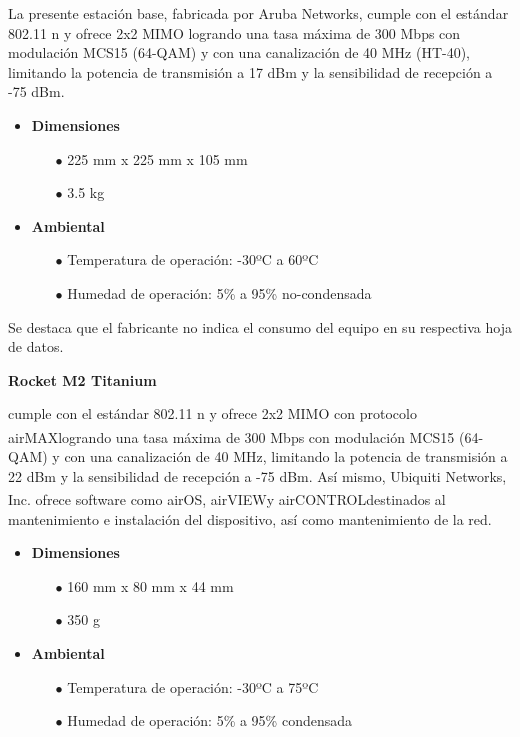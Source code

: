 \documentclass[12pt,a4paper]{book}
\begin{document}
La presente estación base, fabricada por Aruba Networks, cumple con el estándar 802.11 n y ofrece 2x2 MIMO logrando una tasa máxima de 300 Mbps con modulación MCS15 (64-QAM) y con una canalización de 40 
MHz (HT-40), limitando la potencia de transmisión a 17 dBm y la sensibilidad de recepción a -75 dBm. 

\begin{itemize}
\item \textbf{Dimensiones}
	\begin{itemize}
	\item[$\bullet$] 225 mm x 225 mm x 105 mm
	\item[$\bullet$] 3.5 kg
	\end{itemize}
	
\item \textbf{Ambiental}
	\begin{itemize}
	\item[$\bullet$] Temperatura de operación: -30ºC a 60ºC
	\item[$\bullet$] Humedad de operación: 5\% a 95\% no-condensada
	\end{itemize}
\end{itemize}

Se destaca que el fabricante no indica el consumo del equipo en su respectiva hoja de datos.

\medskip 

\begin{large}
\noindent \textbf{Rocket M2 Titanium}
\end{large}

cumple con el estándar 802.11 n y ofrece 2x2 MIMO con protocolo airMAX\textsuperscript \textregistered \thinspace logrando una tasa máxima de 300 Mbps con modulación MCS15 (64-QAM) y con una canalización de 40 MHz, limitando la potencia de transmisión a 22 dBm y la sensibilidad de recepción a -75 dBm. Así mismo, Ubiquiti Networks, Inc. ofrece software como airOS\textsuperscript \textregistered \thinspace , airVIEW\textsuperscript \textregistered \thinspace  y airCONTROL\textsuperscript \textregistered \thinspace destinados al mantenimiento e instalación del dispositivo, así como mantenimiento de la red.


\begin{itemize}
\item \textbf{Dimensiones}
	\begin{itemize}
	\item[$\bullet$] 160 mm x 80 mm x 44 mm
	\item[$\bullet$] 350 g
	\end{itemize}
	
\item \textbf{Ambiental}
	\begin{itemize}
	\item[$\bullet$] Temperatura de operación: -30ºC a 75ºC
	\item[$\bullet$] Humedad de operación: 5\% a 95\% condensada
	\end{itemize}
\end{itemize}
\end{document}
